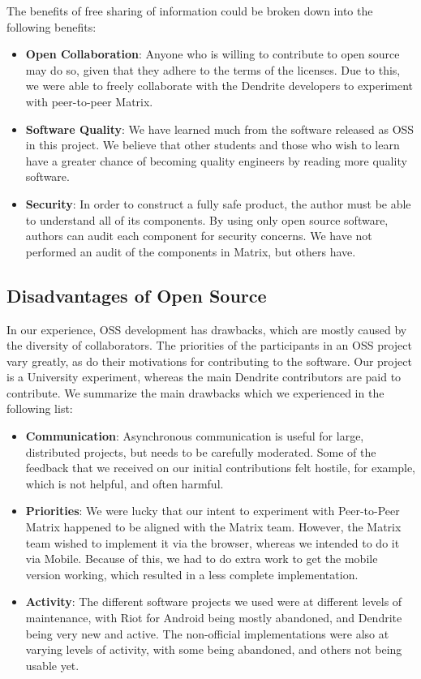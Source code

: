 The benefits of free sharing of information could be broken down into the following benefits:
\begin{itemize}
	\item{
		\textbf{Open Collaboration}:
		Anyone who is willing to contribute to open source may do so, given that they adhere to the terms of the licenses.
		Due to this, we were able to freely collaborate with the Dendrite developers to experiment with peer-to-peer Matrix.
	}
	\item{
		\textbf{Software Quality}:
		We have learned much from the software released as \ac{OSS} in this project.
		We believe that other students and those who wish to learn have a greater chance of becoming quality engineers by reading more quality software.
	}
	\item{
		\textbf{Security}:
		In order to construct a fully safe product, the author must be able to understand all of its components.
		By using only open source software, authors can audit each component for security concerns.
		We have not performed an audit of the components in Matrix, but others have\cite{matrix_olm_cryptographic_review}.
	}
\end{itemize}

\subsection{Disadvantages of Open Source}\label{subsec:open_source_disadvantages}
In our experience, \ac{OSS} development has drawbacks, which are mostly caused by the diversity of collaborators.
The priorities of the participants in an \ac{OSS} project vary greatly, as do their motivations for contributing to the software.
Our project is a University experiment, whereas the main Dendrite contributors are paid to contribute.
We summarize the main drawbacks which we experienced in the following list:
\begin{itemize}
	\item{
		\textbf{Communication}:
		Asynchronous communication is useful for large, distributed projects, but needs to be carefully moderated.
		Some of the feedback that we received on our initial contributions felt hostile, for example, which is not helpful, and often harmful.
	}
	\item{
		\textbf{Priorities}:
		We were lucky that our intent to experiment with Peer-to-Peer Matrix happened to be aligned with the Matrix team.
		However, the Matrix team wished to implement it via the browser, whereas we intended to do it via Mobile.
		Because of this, we had to do extra work to get the mobile version working, which resulted in a less complete implementation.
	}
	\item{
		\textbf{Activity}:
		The different software projects we used were at different levels of maintenance, with Riot for Android being mostly abandoned, and Dendrite being very new and active.
		The non-official implementations were also at varying levels of activity, with some being abandoned, and others not being usable yet.
	}
\end{itemize}

